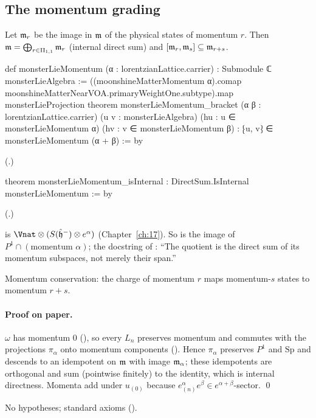 \subsection{The momentum grading}

\begin{theorem}\label{ch18:thm:grading}
Let $\mathfrak{m}_r$ be the image in $\mathfrak{m}$ of the physical states of momentum $r$.  Then $\mathfrak{m}=\bigoplus_{r\in\mathrm{II}_{1,1}}\mathfrak{m}_r$
(internal direct sum) and $[\mathfrak{m}_r,\mathfrak{m}_s]\subseteq\mathfrak{m}_{r+s}$.
\end{theorem}
\begin{leancode}
def monsterLieMomentum (α : lorentzianLattice.carrier) : Submodule ℂ monsterLieAlgebra :=
  ((moonshineMatterMomentum α).comap moonshineMatterNearVOA.primaryWeightOne.subtype).map
    monsterLieProjection
theorem monsterLieMomentum_bracket (α β : lorentzianLattice.carrier)
    (u v : monsterLieAlgebra) (hu : u ∈ monsterLieMomentum α)
    (hv : v ∈ monsterLieMomentum β) : ⁅u, v⁆ ∈ monsterLieMomentum (α + β) := by
\end{leancode}
(.)
\begin{leancode}
theorem monsterLieMomentum_isInternal : DirectSum.IsInternal monsterLieMomentum := by
\end{leancode}
(.)
\begin{dictionary}
 is $\Vnat\otimes(S(\hat{\mathfrak h}^-)\otimes e^\alpha)$ (Chapter~\ref{ch:17}).  So
 is the image of $P^1\cap(\text{momentum }\alpha)$; the docstring of
: ``The quotient is the direct sum of its momentum subspaces, not
merely their span.''
\end{dictionary}
\begin{physics}Momentum conservation: the charge of momentum $r$ maps momentum-$s$ states to momentum $r+s$.\end{physics}
\paragraph{Proof on paper.}  $\omega$ has momentum $0$ (), so every $L_n$
preserves momentum and commutes with the projections $\pi_\alpha$ onto momentum components
().  Hence $\pi_\alpha$ preserves $P^1$ and $\mathrm{Sp}$ and descends to an
idempotent  on $\mathfrak{m}$ with image $\mathfrak{m}_\alpha$; these idempotents are
orthogonal and sum (pointwise finitely) to the identity, which is internal directness.  Momenta add under
$u_{(0)}$ because $e^\alpha_{(n)}e^\beta\in e^{\alpha+\beta}$-sector. \qed
\begin{status}No hypotheses; standard axioms ().\end{status}

